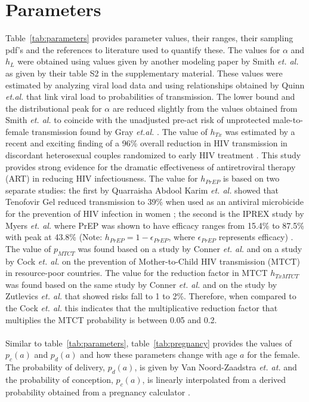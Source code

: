 \documentclass[11pt]{nih_mod}
\begin{document}
\section{Parameters}
\label{sec:parametes}

Table~\ref{tab:parameters} provides parameter values, their ranges, their sampling pdf's and the references to literature used to quantify these. The values for $\alpha$ and $h_L$ were obtained using values given by another modeling paper by Smith {\it et. al.} \cite{Smith2010} as given by their table S2 in the supplementary material. These values were estimated by analyzing viral load data and using relationships obtained by Quinn {\it et.al.} \cite{Quinn2000} that link viral load to probabilities of transmission. The lower bound and the distributional peak for $\alpha$ are reduced slightly from the values obtained from Smith {\it et. al.} \cite{Smith2010} to coincide with the unadjusted pre-act risk of unprotected male-to-female transmission found by Gray {\it et.al.} \cite{Gray2012}. The value of $h_{Tx}$ was estimated by a recent and exciting finding of a 96\% overall reduction in HIV transmission in discordant heterosexual couples randomized to early HIV treatment \cite{Cohen2011}. This study provides strong evidence for the dramatic effectiveness of antiretroviral therapy (ART) in reducing HIV infectiousness. The value for $h_{PrEP}$ is based on two separate studies: the first by Quarraisha Abdool Karim {\it et. al.} showed that Tenofovir Gel reduced transmission to 39\% when used as an antiviral microbicide for the prevention of HIV infection in women \cite{Karim2010}; the second is the IPREX study by Myers {\it et. al.} where PrEP was shown to have efficacy ranges from 15.4\% to 87.5\%
with peak at 43.8\% (Note: $h_{PrEP}=1-\epsilon_{PrEP}$, where $\epsilon_{PrEP}$ represents efficacy) \cite{Myers2011}. The value of $p_{MTCT}$ was found based on a study by Conner {\it et. al.} \cite{Connor1994} and on a study by Cock {\it et. al.} \cite{Cock2000} on the prevention of Mother-to-Child  HIV transmission (MTCT) in resource-poor countries. The value for the reduction factor in MTCT $h_{TxMTCT}$ was found based on the same study by Conner {\it et. al.} \cite{Connor1994} and on the study by Zutlevics {\it et. al.} \cite{Zutlievics2006} that showed risks fall to 1 to 2\%. Therefore, when compared to the Cock {\it et. al.} this indicates that the multiplicative reduction factor that multiplies the MTCT probability is between 0.05 and 0.2.
\\
\\Similar to table~\ref{tab:parameters}, table~\ref{tab:pregnancy} provides the values of $p_c(a)$ and $p_d(a)$ and how these parameters change with age $a$ for the female.  The probability of delivery, $p_d(a)$, is given by Van Noord-Zaadstra {\it et. at.} \cite{Noord-Zaadstra1991} and the probability of conception, $p_c(a)$, is linearly interpolated from a derived probability obtained from a pregnancy calculator \cite{CalculatorsLive2012}. 
\end{document}
